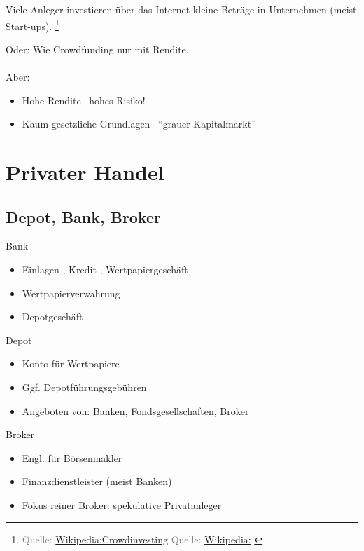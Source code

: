 \documentclass{beamer}
\let\oldfootnote\footnote
\renewcommand{\footnote}[1]
{%
	\oldfootnote
	{
		\tiny
		\textcolor{gray}{#1}
	}%
}
\newcommand{\citewiki}[2][]
{%
	\footnote
	{
		\ifthenelse{\isempty{#1}}
		{
			Quelle: \href{https://de.wikipedia.org/wiki/#2}{Wikipedia:#2}
		}
		{
			Quelle: \href{https://de.wikipedia.org/wiki/#2}{Wikipedia:#1}
		}
	}
}
\begin{document}
			\begin{frame}
				\begin{definition}
					Viele Anleger investieren über das Internet kleine Beträge in Unternehmen (meist  Start-ups).\citewiki{Crowdinvesting}
				\end{definition}
				Oder: Wie Crowdfunding nur mit Rendite.\\
				\hfill\\
				Aber:
				\begin{itemize}
					\item Hohe Rendite \textrightarrow\ hohes Risiko!
					\item Kaum gesetzliche Grundlagen \textrightarrow\ "`grauer Kapitalmarkt"'
				\end{itemize}
			\end{frame}
	
	\section{Privater Handel}
	
		\begin{frame}
		\end{frame}
	
		\subsection{Depot, Bank, Broker}
		
			\begin{frame}{Bank}
				\begin{itemize}
					\item Einlagen-, Kredit-, Wertpapiergeschäft
					\item Wertpapierverwahrung
					\item Depotgeschäft
				\end{itemize}
			\end{frame}
		
			\begin{frame}{Depot}
				\begin{itemize}
					\item Konto für Wertpapiere
					\item Ggf. Depotführungsgebühren
					\item Angeboten von: Banken, Fondsgesellschaften, Broker
				\end{itemize}
			\end{frame}
		
			\begin{frame}{Broker}
				\begin{itemize}
					\item Engl. für Börsenmakler
					\item Finanzdienstleister (meist Banken)
					\item Fokus reiner Broker: spekulative Privatanleger
				\end{itemize}
			\end{frame}
		
\end{document}
